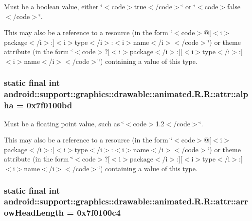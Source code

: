 Must be a boolean value, either \char`\"{}$<$code$>$true$<$/code$>$\char`\"{} or \char`\"{}$<$code$>$false$<$/code$>$\char`\"{}. 

This may also be a reference to a resource (in the form \char`\"{}$<$code$>$@\mbox{[}$<$i$>$package$<$/i$>$:\mbox{]}$<$i$>$type$<$/i$>$:$<$i$>$name$<$/i$>$$<$/code$>$\char`\"{}) or theme attribute (in the form \char`\"{}$<$code$>$?\mbox{[}$<$i$>$package$<$/i$>$:\mbox{]}\mbox{[}$<$i$>$type$<$/i$>$:\mbox{]}$<$i$>$name$<$/i$>$$<$/code$>$\char`\"{}) containing a value of this type. \hypertarget{classandroid_1_1support_1_1graphics_1_1drawable_1_1animated_1_1_r_1_1attr_9363b95d23f8b98c950c15c2d71554e4}{
\subsubsection[{alpha}]{\setlength{\rightskip}{0pt plus 5cm}static final int android::support::graphics::drawable::animated.R.R::attr::alpha = 0x7f0100bd}}
\label{classandroid_1_1support_1_1graphics_1_1drawable_1_1animated_1_1_r_1_1attr_9363b95d23f8b98c950c15c2d71554e4}


Must be a floating point value, such as \char`\"{}$<$code$>$1.2$<$/code$>$\char`\"{}. 

This may also be a reference to a resource (in the form \char`\"{}$<$code$>$@\mbox{[}$<$i$>$package$<$/i$>$:\mbox{]}$<$i$>$type$<$/i$>$:$<$i$>$name$<$/i$>$$<$/code$>$\char`\"{}) or theme attribute (in the form \char`\"{}$<$code$>$?\mbox{[}$<$i$>$package$<$/i$>$:\mbox{]}\mbox{[}$<$i$>$type$<$/i$>$:\mbox{]}$<$i$>$name$<$/i$>$$<$/code$>$\char`\"{}) containing a value of this type. \hypertarget{classandroid_1_1support_1_1graphics_1_1drawable_1_1animated_1_1_r_1_1attr_966beb18d3d304051bc5dcee77f9d599}{
\subsubsection[{arrowHeadLength}]{\setlength{\rightskip}{0pt plus 5cm}static final int android::support::graphics::drawable::animated.R.R::attr::arrowHeadLength = 0x7f0100c4}}
\label{classandroid_1_1support_1_1graphics_1_1drawable_1_1animated_1_1_r_1_1attr_966beb18d3d304051bc5dcee77f9d599}


